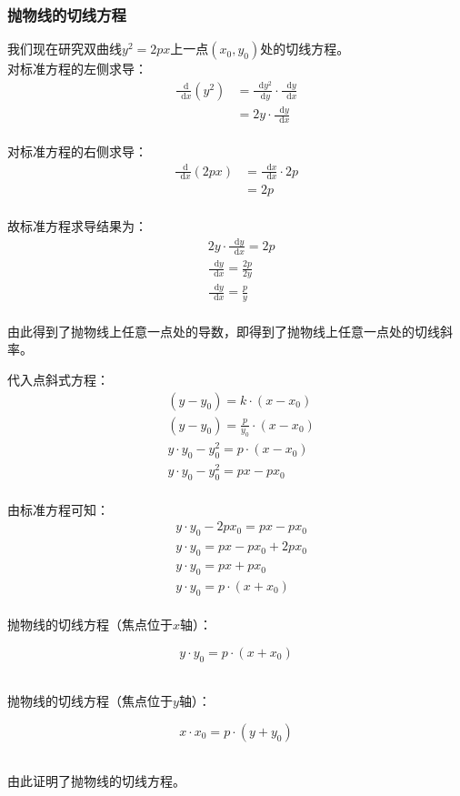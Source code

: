 \documentclass[UTF8]{ctexart}
\newcommand*{\dif}{\mathop{}\!\mathrm{d}}
\begin{document}
\subsubsection{抛物线的切线方程}
    我们现在研究双曲线$y^2=2px$上一点$(x_0,y_0)$处的切线方程。\\[5mm]
    对标准方程的左侧求导：
    \setcounter{equation}{0}
    \begin{align}
        \frac{\dif}{\dif x}\left(y^2\right)
        &=\frac{\dif y^2}{\dif y}\cdot\frac{\dif y}{\dif x}\\[6mm]
        &=2y\cdot\frac{\dif y}{\dif x}
    \end{align}\\
    对标准方程的右侧求导：
    \begin{align}
        \frac{\dif}{\dif x}\left(2px\right)
        &=\frac{\dif x}{\dif x}\cdot 2p\\[6mm]
        &=2p
    \end{align}\\
    故标准方程求导结果为：
    \begin{align}
        &2y\cdot\frac{\dif y}{\dif x}=2p\\[6mm]
        &\frac{\dif y}{\dif x}=\frac{2p}{2y}\\[6mm]
        &\frac{\dif y}{\dif x}=\frac{p}{y}
    \end{align}\\
    由此得到了抛物线上任意一点处的导数，即得到了抛物线上任意一点处的切线斜率。

\newpage

    代入点斜式方程：
    \begin{align}
        &(y-y_0)=k\cdot(x-x_0)\\[3mm]
        &(y-y_0)=\frac{p}{y_0}\cdot(x-x_0)\\[3mm]
        &y\cdot y_0-y_0^2=p\cdot(x-x_0)\\[3mm]
        &y\cdot y_0-y_0^2=px-px_0
    \end{align}\\
    由标准方程可知：
    \begin{align}
        &y\cdot y_0-2px_0=px-px_0\\[3mm]
        &y\cdot y_0=px-px_0+2px_0\\[3mm]
        &y\cdot y_0=px+px_0\\[3mm]
        &y\cdot y_0=p\cdot(x+x_0)
    \end{align}\\
    抛物线的切线方程（焦点位于$x$轴）：
    \begin{large}
        \begin{equation*}
            y\cdot y_0=p\cdot(x+x_0)
        \end{equation*}
    \end{large}\\
    抛物线的切线方程（焦点位于$y$轴）：
    \begin{large}
        \begin{equation*}
            x\cdot x_0=p\cdot(y+y_0)
        \end{equation*}
    \end{large}\\
    由此证明了抛物线的切线方程。
\end{document}
